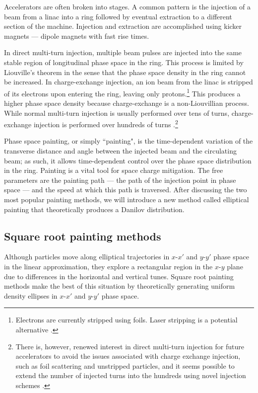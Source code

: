 Accelerators are often broken into stages. A common pattern is the injection of a beam from a linac into a ring followed by eventual extraction to a different section of the machine. Injection and extraction are accomplished using kicker magnets — dipole magnets with fast rise times.

In direct multi-turn injection, multiple beam pulses are injected into the same stable region of longitudinal phase space in the ring. This process is limited by Liouville's theorem in the sense that the phase space density in the ring cannot be increased. In charge-exchange injection, an ion beam from the linac is stripped of its electrons upon entering the ring, leaving only protons.\footnote{Electrons are currently stripped using foils. Laser stripping is a potential alternative \cite{Cousineau2017}.} This produces a higher phase space density because charge-exchange is a non-Liouvillian process. While normal multi-turn injection is usually performed over tens of turns, charge-exchange injection is performed over hundreds of turns \cite{Bracco2017}.\footnote{There is, however, renewed interest in direct multi-turn injection for future accelerators to avoid the issues associated with charge exchange injection, such as foil scattering and unstripped particles, and it seems possible to extend the number of injected turns into the hundreds using novel injection schemes \cite{Prior2016}.} 

Phase space painting, or simply ``painting", is the time-dependent variation of the transverse distance and angle between the injected beam and the circulating beam; as such, it allows time-dependent control over the phase space distribution in the ring. Painting is a vital tool for space charge mitigation. The free parameters are the painting path — the path of the injection point in phase space — and the speed at which this path is traversed. After discussing the two most popular painting methods, we will introduce a new method called elliptical painting that theoretically produces a Danilov distribution.


\subsection{Square root painting methods}

Although particles move along elliptical trajectories in $x$-$x'$ and $y$-$y'$ phase space in the linear approximation, they explore a rectangular region in the $x$-$y$ plane due to differences in the horizontal and vertical tunes. Square root painting methods make the best of this situation by theoretically generating uniform density ellipses in $x$-$x'$ and $y$-$y'$ phase space. 

